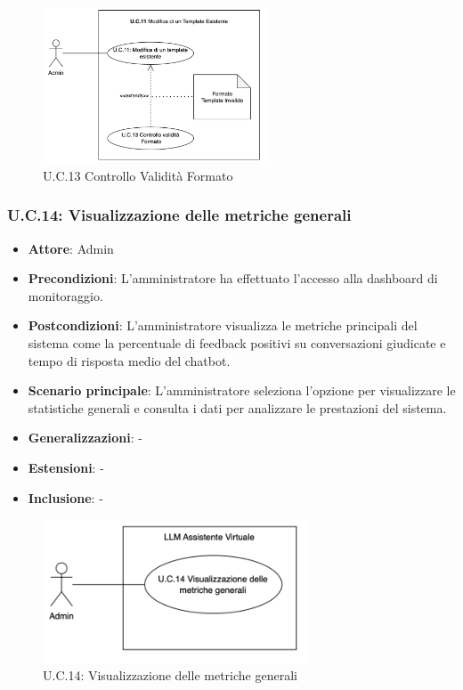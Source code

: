 \begin{figure}[H]
    \centering
    \includegraphics[width=0.6\textwidth]{img/UC13.2.png}
    \caption{U.C.13 Controllo Validità Formato}
\end{figure}
\newpage

\subsubsection{U.C.14: Visualizzazione delle metriche generali}
\begin{itemize}
    \item \textbf{Attore}: Admin
    \item \textbf{Precondizioni}: L'amministratore ha effettuato l'accesso alla dashboard di monitoraggio.
    \item \textbf{Postcondizioni}: L'amministratore visualizza le metriche principali del sistema come la percentuale di feedback positivi su conversazioni giudicate e tempo di risposta medio del chatbot.
    \item \textbf{Scenario principale}: L'amministratore seleziona l'opzione per visualizzare le statistiche generali e consulta i dati per analizzare le prestazioni del sistema.
    \item \textbf{Generalizzazioni}: -
    \item \textbf{Estensioni}: -
    \item \textbf{Inclusione}: -
\end{itemize}
\begin{figure}[H]
    \centering
    \includegraphics[width=0.7\textwidth]{img/UC14.png}
    \caption{U.C.14: Visualizzazione delle metriche generali}
\end{figure}
\newpage

